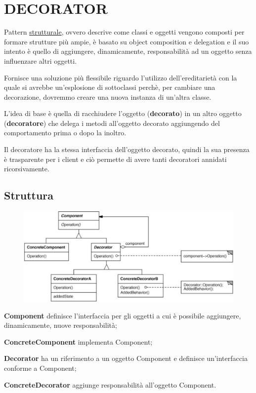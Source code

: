 \chapter{DECORATOR}

Pattern \underline{strutturale}, ovvero descrive come classi e oggetti vengono composti per formare strutture più ampie, è basato su object composition e delegation e 
il suo intento è quello di aggiungere, dinamicamente, responsabilità ad un oggetto senza influenzare altri oggetti.

Fornisce una soluzione più flessibile riguardo l'utilizzo dell'ereditarietà con la quale si avrebbe un'esplosione di sottoclassi perchè, per cambiare una decorazione, 
dovremmo creare una nuova instanza di un'altra classe.

L'idea di base è quella di racchiudere l'oggetto (\textbf{decorato}) in un altro oggetto (\textbf{decoratore}) che delega i metodi all'oggetto decorato aggiungendo del 
comportamento prima o dopo la inoltro.

Il decoratore ha la stessa interfaccia dell’oggetto decorato, quindi la sua presenza è trasparente per i client e ciò permette di avere tanti decoratori annidati
ricorsivamente.

\section{Struttura}

\begin{figure}[H]
    \centering
    \includegraphics[width=0.5\linewidth]{../../immagini/decorator/struttura_decorator}    
\end{figure}

\textbf{Component} definisce l'interfaccia per gli oggetti a cui è possibile aggiungere, dinamicamente, nuove responsabilità;

\textbf{ConcreteComponent} implementa Component;

\textbf{Decorator} ha un riferimento a un oggetto Component e definisce un'interfaccia conforme a Component;

\textbf{ConcreteDecorator} aggiunge responsabilità all'oggetto Component.
\medskip

